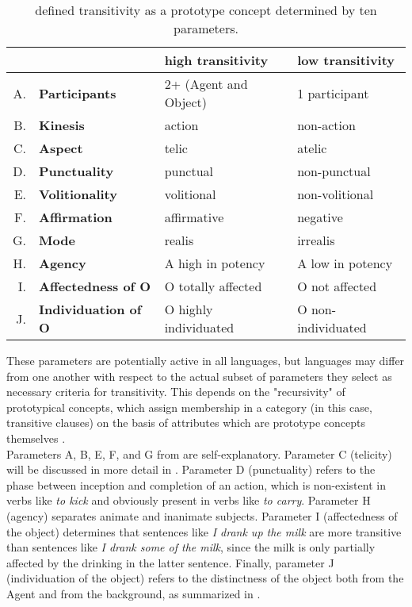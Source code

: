 \begin{table}[htb] %
\caption{\textcite[252]{HopperThompson1980} defined transitivity as a prototype concept determined by ten parameters.}
\begin{tabular}{rl|ll}
 & & \textbf{high transitivity} & \textbf{low transitivity} \\
 \hline
A. & \textbf{Participants} & 2+ (Agent and Object)  & 1 participant  \\
B. & \textbf{Kinesis} & action  & non-action  \\
C. & \textbf{Aspect} & telic  & atelic  \\
D. & \textbf{Punctuality} & punctual  & non-punctual  \\
E. & \textbf{Volitionality} & volitional  & non-volitional  \\
F. & \textbf{Affirmation} & affirmative  & negative  \\
G. & \textbf{Mode} & realis  & irrealis  \\
H. & \textbf{Agency} & A high in potency  & A low in potency   \\
I. & \textbf{Affectedness of O} & O totally affected  & O not affected  \\
J. & \textbf{Individuation of O} & O highly individuated  & O non-individuated  
\end{tabular}
\end{table}

These parameters are potentially active in all languages, but languages may differ from one another with respect to the actual subset of parameters they select as necessary criteria for transitivity. This depends on the "recursivity" \parencite[29]{Naess2007} of prototypical concepts, which assign membership in a category (in this case, transitive clauses) on the basis of attributes which are prototype concepts themselves \parencite[61]{taylor1995linguistic}.\\
Parameters A, B, E, F, and G from  are self-explanatory. Parameter C (telicity) will be discussed in more detail in . Parameter D (punctuality) refers to the phase between inception and completion of an action, which is non-existent in verbs like \textit{to kick} and obviously present in verbs like \textit{to carry}. Parameter H (agency) separates animate and inanimate subjects. Parameter I (affectedness of the object) determines that sentences like \textit{I drank up the milk} are more transitive than sentences like \textit{I drank some of the milk}, since the milk is only partially affected by the drinking in the latter sentence. Finally, parameter J (individuation of the object) refers to the distinctness of the object both from the Agent and from the background, as summarized in  \parencite[253]{HopperThompson1980}.

